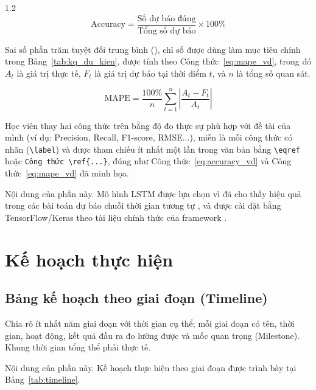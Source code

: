 \begin{spacing}{1.2}
\begin{equation}
\text{Accuracy} = \frac{\text{Số dự báo đúng}}{\text{Tổng số dự báo}} \times 100\%
\label{eq:accuracy_vd}
\end{equation}

Sai số phần trăm tuyệt đối trung bình (), chỉ số được dùng làm mục tiêu chính trong Bảng~\ref{tab:kq_du_kien}, được tính theo Công thức~\eqref{eq:mape_vd}, trong đó $A_t$ là giá trị thực tế, $F_t$ là giá trị dự báo tại thời điểm $t$, và $n$ là tổng số quan sát.

\begin{equation}
\text{MAPE} = \frac{100\%}{n} \sum_{t=1}^{n} \left| \frac{A_t - F_t}{A_t} \right|
\label{eq:mape_vd}
\end{equation}

Học viên thay hai công thức trên bằng độ đo thực sự phù hợp với đề tài của mình (ví dụ: Precision, Recall, F1-score, RMSE...), miễn là mỗi công thức có nhãn (\texttt{\textbackslash label}) và được tham chiếu ít nhất một lần trong văn bản bằng \texttt{\textbackslash eqref} hoặc \texttt{Công thức~\textbackslash ref\{...\}}, đúng như Công thức~\eqref{eq:accuracy_vd} và Công thức~\eqref{eq:mape_vd} đã minh họa.

Nội dung của phần này. Mô hình LSTM được lựa chọn vì đã cho thấy hiệu quả trong các bài toán dự báo chuỗi thời gian tương tự \cite{vidu_tapchi}, và được cài đặt bằng TensorFlow/Keras theo tài liệu chính thức của framework \cite{vidu_website}.

\section{Kế hoạch thực hiện}
\label{sec:ke_hoach}

\subsection{Bảng kế hoạch theo giai đoạn (Timeline)}
\label{subsec:timeline}

\begin{huongdan}
Chia rõ ít nhất năm giai đoạn với thời gian cụ thể; mỗi giai đoạn có tên, thời gian, hoạt động, kết quả đầu ra đo lường được và mốc quan trọng (Milestone). Khung thời gian tổng thể phải thực tế.
\end{huongdan}

Nội dung của phần này. Kế hoạch thực hiện theo giai đoạn được trình bày tại Bảng~\ref{tab:timeline}.


\end{spacing}
